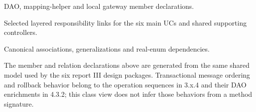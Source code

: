 DAO, mapping-helper and local gateway member declarations.

Selected layered responsibility links for the six main UCs and shared supporting controllers.

Canonical associations, generalizations and real-enum dependencies.

The member and relation declarations above are generated from the same shared model used by the six report III design packages. Transactional message ordering and rollback behavior belong to the operation sequences in 3.x.4 and their DAO enrichments in 4.3.2; this class view does not infer those behaviors from a method signature.
